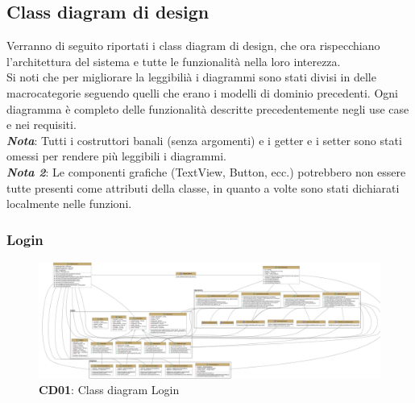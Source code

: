 \subsection{Class diagram di design}
    \begin{flushleft}
        Verranno di seguito riportati i class diagram di design, che ora rispecchiano l'architettura del sistema e tutte le funzionalità nella loro
        interezza. \\
        Si noti che per migliorare la leggibilià i diagrammi sono stati divisi in delle macrocategorie seguendo quelli che erano i modelli di dominio precedenti.
        Ogni diagramma è completo delle funzionalità descritte precedentemente negli use case e nei requisiti.\\
        \emph{\textbf{Nota}}: Tutti i costruttori banali (senza argomenti) e i getter e i setter sono stati omessi per rendere più leggibili i diagrammi.\\
        \emph{\textbf{Nota 2}}: Le componenti grafiche (TextView, Button, ecc.) potrebbero non essere tutte presenti come attributi della classe, in quanto a volte sono stati dichiarati localmente nelle funzioni.
        
    \end{flushleft}

    \subsubsection{Login}
        \begin{figure}[H]
            \centering
            \includegraphics[scale=0.12]{assets/diagrammi/Class diagram di design/ClassDiagram_Login.png}
            \caption*{\textbf{CD01}: Class diagram Login}\label{fig:ClassDiagram_Login}
        \end{figure}
    
